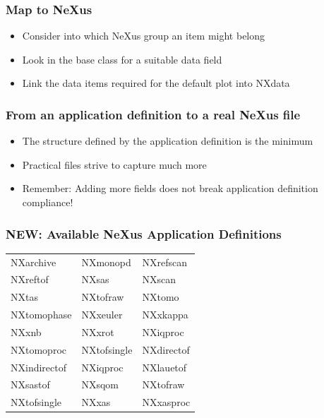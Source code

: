 \documentclass{beamer}
\newcommand{\changefont}[3] {
 \fontfamily{#1} \fontseries{#2} \fontshape{#3} \selectfont}
\begin{document}
\begin{frame}
\frametitle{Map to NeXus}
\begin{itemize}
\item Consider into which NeXus group an item might belong
\item Look in the base class for a suitable data field
\item Link the data items required for the default plot into NXdata
\end{itemize}
\end{frame}

\begin{frame}
\frametitle{From an application definition to a real NeXus file}
\begin{itemize}
\item<1->The structure defined by the application definition is the minimum
\item<2->Practical files strive to capture much more
\item<4-> Remember: {\color{red}Adding more fields does not break application definition compliance!} 
\end{itemize}
\end{frame}

\begin{frame} \frametitle{{\color{red}NEW}: Available NeXus Application Definitions}
{\changefont{cmr}{bx}{sc} 
\begin{tabular}{lll}
NXarchive& NXmonopd & NXrefscan \\
NXreftof & NXsas & NXscan \\
NXtas & NXtofraw& NXtomo\\
NXtomophase & NXxeuler & NXxkappa\\
NXxnb & NXxrot & NXiqproc \\
NXtomoproc & NXtofsingle& NXdirectof\\
NXindirectof & NXiqproc& NXlauetof\\
NXsastof& NXsqom& NXtofraw\\
NXtofsingle& NXxas& NXxasproc\\
\end{tabular}
}
\end{frame}
\end{document}

